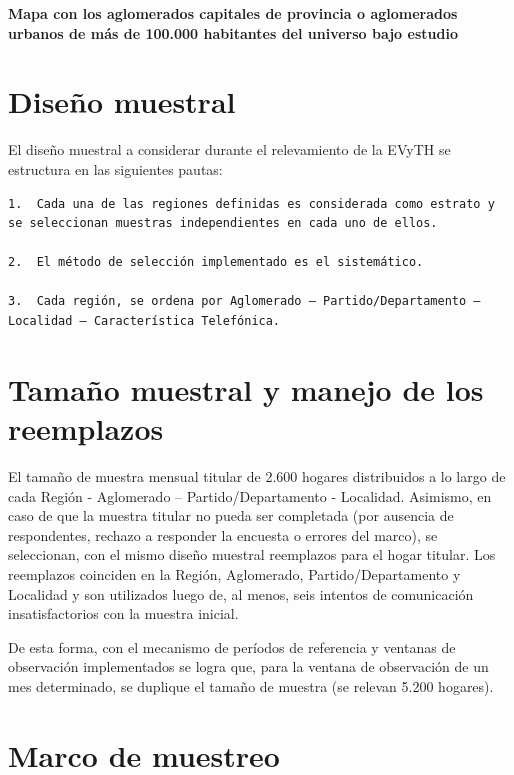 \documentclass[
  openany]{book}
\begin{document}
\textbf{Mapa con los aglomerados capitales de provincia o aglomerados urbanos de más de 100.000 habitantes del universo bajo estudio}

\hypertarget{diseuxf1o-muestral}{%
\section{Diseño muestral}\label{diseuxf1o-muestral}}

El diseño muestral a considerar durante el relevamiento de la EVyTH se estructura en las siguientes pautas:

\begin{verbatim}
1.  Cada una de las regiones definidas es considerada como estrato y se seleccionan muestras independientes en cada uno de ellos.

2.  El método de selección implementado es el sistemático.

3.  Cada región, se ordena por Aglomerado – Partido/Departamento – Localidad – Característica Telefónica.
\end{verbatim}

\hypertarget{tamauxf1o-muestral-y-manejo-de-los-reemplazos}{%
\section{Tamaño muestral y manejo de los reemplazos}\label{tamauxf1o-muestral-y-manejo-de-los-reemplazos}}

El tamaño de muestra mensual titular de 2.600 hogares distribuidos a lo largo de cada Región - Aglomerado -- Partido/Departamento - Localidad. Asimismo, en caso de que la muestra titular no pueda ser completada (por ausencia de respondentes, rechazo a responder la encuesta o errores del marco), se seleccionan, con el mismo diseño muestral reemplazos para el hogar titular. Los reemplazos coinciden en la Región, Aglomerado, Partido/Departamento y Localidad y son utilizados luego de, al menos, seis intentos de comunicación insatisfactorios con la muestra inicial.

De esta forma, con el mecanismo de períodos de referencia y ventanas de observación implementados se logra que, para la ventana de observación de un mes determinado, se duplique el tamaño de muestra (se relevan 5.200 hogares).

\hypertarget{marco-de-muestreo}{%
\section{Marco de muestreo}\label{marco-de-muestreo}}
\end{document}

